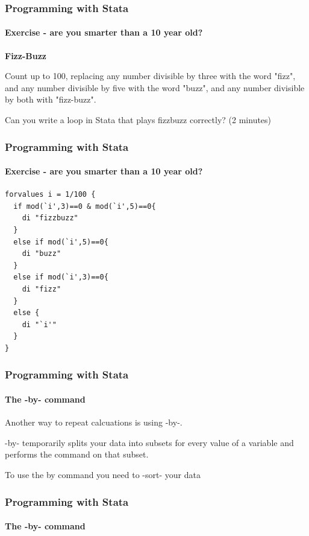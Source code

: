 \documentclass{beamer}
\begin{document}
\begin{frame}[fragile]
  \frametitle{Programming with Stata}
  \framesubtitle{Exercise - are you smarter than a 10 year old?}

\textbf{\Large Fizz-Buzz}
\medskip

Count up to 100, replacing any number divisible by three with the word "fizz", and any number divisible by five with the word "buzz", and any number divisible by both with "fizz-buzz".

\medskip

Can you write a loop in Stata that plays fizzbuzz correctly? (2 minutes)
\end{frame}


\begin{frame}[fragile]
  \frametitle{Programming with Stata}
  \framesubtitle{Exercise - are you smarter than a 10 year old?}
 \begin{verbatim}
forvalues i = 1/100 {
  if mod(`i',3)==0 & mod(`i',5)==0{
    di "fizzbuzz"
  } 
  else if mod(`i',5)==0{
    di "buzz"
  }
  else if mod(`i',3)==0{
    di "fizz"
  }
  else {
    di "`i'"
  }
}
  \end{verbatim}
\end{frame}

\begin{frame}[fragile]
  \frametitle{Programming with Stata}
  \framesubtitle{The -by- command}
Another way to repeat calcuations is using -by-.

\medskip

-by- temporarily splits your data into subsets for every value of a variable and performs the command on that subset.

\medskip

To use the by command you need to -sort- your data
\end{frame}

\begin{frame}[fragile]
  \frametitle{Programming with Stata}
  \framesubtitle{The -by- command}



\end{frame}

\end{document}
